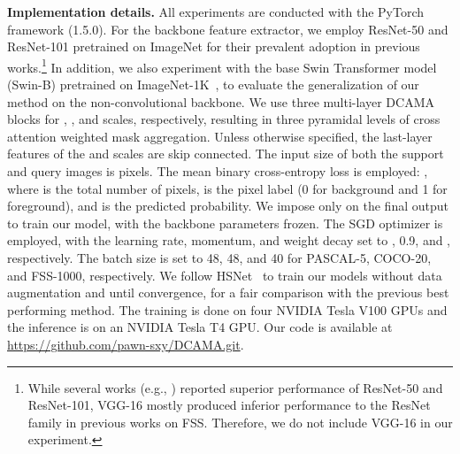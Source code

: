 \documentclass[runningheads,table,xcdraw]{llncs}
\begin{document}
\textbf{Implementation details.}
All experiments are conducted with the PyTorch \cite{paszke2019pytorch} framework (1.5.0).
{\color{blue}For the backbone feature extractor, we employ ResNet-50 and ResNet-101 \cite{he2016deep} pretrained on ImageNet \cite{deng2009imagenet} for their prevalent adoption in previous works.\footnote{\color{red}While several works (e.g., \cite{tian2020prior}) reported superior performance of ResNet-50 and ResNet-101, VGG-16 \cite{simonyan2014very} mostly produced inferior performance to the ResNet family in previous works on FSS.
Therefore, we do not include VGG-16 in our experiment.}
In addition, we also experiment with the base Swin Transformer model (Swin-B) pretrained on ImageNet-1K~\cite{liu2021swin}, to evaluate the generalization of our method on the non-convolutional backbone.}
We use three multi-layer DCAMA blocks for , , and  scales, respectively, resulting in three pyramidal levels of cross attention weighted mask aggregation.
Unless otherwise specified, the last-layer features of the  and  scales are skip connected.
The input size of both the support and query images is  pixels.
{\color{purple}The mean binary cross-entropy loss is employed: , where  is the total number of pixels,  is the pixel label (0 for background and 1 for foreground), and  is the predicted probability.
We impose  only on the final output to train our model, with the backbone parameters frozen.}
The SGD optimizer is employed, with the learning rate, momentum, and weight decay set to , 0.9, and , respectively.
The batch size is set to 48, 48, and 40 for PASCAL-5, COCO-20, and FSS-1000, respectively.
We follow HSNet~\cite{min2021hypercorrelation} to train our models without data augmentation and until convergence, for a fair comparison with the previous best performing method.
The training is done on four NVIDIA Tesla V100 GPUs and the inference is on an NVIDIA Tesla T4 GPU.
Our code is available at \url{https://github.com/pawn-sxy/DCAMA.git}.
\end{document}
